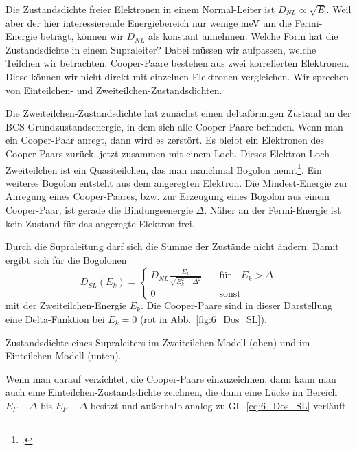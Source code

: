 Die Zustandsdichte freier Elektronen in einem Normal-Leiter ist $D_{NL} \propto \sqrt{E}$. Weil aber der hier interessierende Energiebereich nur wenige meV um die Fermi-Energie beträgt, können wir $D_{NL}$ als konstant annehmen. Welche Form hat die Zustandsdichte in einem Supraleiter? Dabei müssen wir aufpassen, welche Teilchen wir betrachten. Cooper-Paare bestehen aus zwei korrelierten Elektronen. Diese können wir nicht direkt mit einzelnen Elektronen vergleichen. Wir sprechen von Einteilchen- und Zweiteilchen-Zustandsdichten.

Die Zweiteilchen-Zustandsdichte hat zunächst einen deltaförmigen Zustand an der BCS-Grundzustandsenergie, in dem sich alle Cooper-Paare befinden. Wenn man ein Cooper-Paar anregt, dann wird es zerstört. Es bleibt ein Elektronen des Cooper-Paars zurück, jetzt zusammen mit einem Loch. Dieses Elektron-Loch-Zweiteilchen ist ein Quasiteilchen, das  man manchmal Bogolon nennt\footcite{Kopitzki_FK}. Ein weiteres Bogolon entsteht aus dem angeregten Elektron. Die Mindest-Energie zur Anregung eines Cooper-Paares, bzw. zur Erzeugung eines Bogolon aus einem Cooper-Paar, ist gerade die Bindungsenergie $\Delta$. Näher an der Fermi-Energie ist kein Zustand für das angeregte Elektron frei.

Durch die Supraleitung darf sich die Summe der Zustände nicht ändern. Damit ergibt sich für die Bogolonen 
\begin{equation}
    D_{SL}(E_k) = \left\{ 
    \begin{matrix}
    D_{NL} \frac{E_k}{\sqrt{E_k^2 - \Delta^2}} \quad &\text{für} \quad E_k > \Delta \\
     0 & \text{sonst} 
    \end{matrix}
    \right. \label{eq:6_Dos_SL}
\end{equation}
mit der Zweiteilchen-Energie $E_k$. Die Cooper-Paare sind in dieser Darstellung eine Delta-Funktion bei $E_k = 0$ (rot in Abb.~\ref{fig:6_Dos_SL}).

\begin{marginfigure}[-40mm]


    \caption{Zustandsdichte eines Supraleiters im Zweiteilchen-Modell (oben) und im Einteilchen-Modell (unten).}
    \label{fig:6_Dos_SL}
\end{marginfigure}

Wenn man darauf verzichtet, die Cooper-Paare einzuzeichnen, dann kann man auch eine Einteilchen-Zustandsdichte zeichnen, die dann eine Lücke im Bereich $E_F - \Delta$ bis $E_F + \Delta$ besitzt und außerhalb analog zu Gl.~\ref{eq:6_Dos_SL} verläuft.


